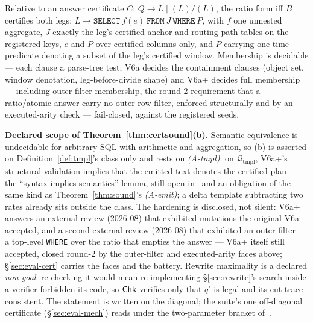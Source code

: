 \begin{definition}
\label{def:tmpl}
 Relative to an answer certificate $C$:
$Q\to L\mid(L)/(L)$, the ratio form iff $B$ certifies both legs;
$L\to\texttt{SELECT}\ f(e)\ \texttt{FROM}\ J\ \texttt{WHERE}\ P$, with
$f$ one unnested aggregate, $J$ exactly the leg's certified anchor and
routing-path tables on the registered keys, $e$ and $P$ over certified
columns only, and $P$ carrying one time predicate denoting a subset of
the leg's certified window. Membership is decidable --- each clause a
parse-tree test; V6a decides the containment clauses (object set, window
denotation, leg-before-divide shape) and V6a+ decides full membership ---
including outer-filter membership, the round-2 requirement that a ratio/atomic
answer carry no outer row filter, enforced structurally and by an
executed-arity check --- fail-closed, against the registered seeds.
\end{definition}

\smallskip\noindent{}\textbf{Declared scope of Theorem~\ref{thm:certsound}(b).}
Semantic equivalence is undecidable for arbitrary SQL with arithmetic and
aggregation, so (b) is asserted on Definition~\ref{def:tmpl}'s class only
and rests on \emph{(A-tmpl)}: on $\mathcal{Q}_{\mathrm{tmpl}}$, V6a+'s
structural validation implies that the emitted text denotes the certified
plan --- the ``syntax implies semantics'' lemma, still open
in~\cite{asofgov-tr} and an obligation of the same kind as
Theorem~\ref{thm:sound}'s \emph{(A-emit)}; a delta template subtracting
two rates already sits outside the class. The hardening is disclosed, not
silent: V6a+ answers an external review (2026-08) that exhibited mutations
the original V6a accepted, and a second external review (2026-08) that
exhibited an outer filter --- a top-level \texttt{WHERE} over the ratio that
empties the answer --- V6a+ itself still accepted, closed round-2 by the
outer-filter and executed-arity faces above; \S\ref{sec:eval-cert} carries the
faces and the battery. Rewrite maximality is a declared
\emph{non-goal}: re-checking it would mean re-implementing
\S\ref{sec:rewrite}'s search inside a verifier forbidden its code, so
$\mathsf{Chk}$ verifies only that $q'$ is legal and its cut trace consistent.
The statement is written on the diagonal; the suite's one off-diagonal
certificate (\S\ref{sec:eval-mech}) reads under the two-parameter bracket
of~\cite{asofgov-tr}.

